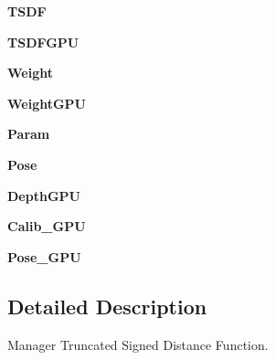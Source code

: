 \begin{DoxyCompactItemize}
\item 
\mbox{\label{class_t_s_d_f_1_1_t_s_d_f_manager_ae4a4044d7a75f29253c881a6251a9a56}} 
{\bfseries T\+S\+DF}
\item 
\mbox{\label{class_t_s_d_f_1_1_t_s_d_f_manager_a45f195df89365375e90764ec5f4db45a}} 
{\bfseries T\+S\+D\+F\+G\+PU}
\item 
\mbox{\label{class_t_s_d_f_1_1_t_s_d_f_manager_a483b831ae3d1db5673c8a52bfbfb8122}} 
{\bfseries Weight}
\item 
\mbox{\label{class_t_s_d_f_1_1_t_s_d_f_manager_a2c8e6ea973970a12c53a1c2f5c41ee3d}} 
{\bfseries Weight\+G\+PU}
\item 
\mbox{\label{class_t_s_d_f_1_1_t_s_d_f_manager_a5bd5a67350759d1753c68f4a9de7173b}} 
{\bfseries Param}
\item 
\mbox{\label{class_t_s_d_f_1_1_t_s_d_f_manager_a3ce2a5f73dbea97591620ba0a6be2cf3}} 
{\bfseries Pose}
\item 
\mbox{\label{class_t_s_d_f_1_1_t_s_d_f_manager_a0fa22055c7f9ee209143a1e20765af2b}} 
{\bfseries Depth\+G\+PU}
\item 
\mbox{\label{class_t_s_d_f_1_1_t_s_d_f_manager_a003face100e7ed90b22085c72b7cd8f1}} 
{\bfseries Calib\+\_\+\+G\+PU}
\item 
\mbox{\label{class_t_s_d_f_1_1_t_s_d_f_manager_a007719dcd94065704861fbdf742b08be}} 
{\bfseries Pose\+\_\+\+G\+PU}
\end{DoxyCompactItemize}


\subsection{Detailed Description}
\begin{DoxyVerb}Manager Truncated Signed Distance Function.
\end{DoxyVerb}
 

